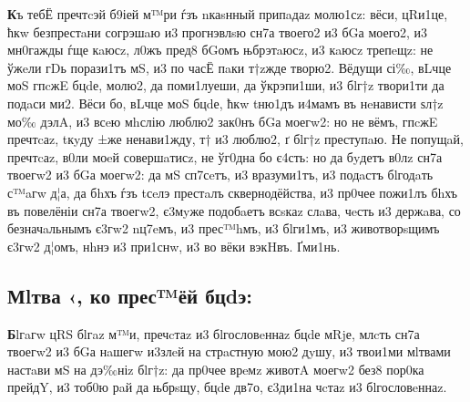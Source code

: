 \textbf{К}ъ тебЁ пречтcэй б9іей м™ри ѓзъ nкаsнный припaдаz молю1сz: вёси, цRи1це,
ћкw безпрестaни согрэшaю и3 прогнэвлsю сн7а твоего2 и3 бGа моего2, и3
мн0гажды ѓще кaюсz, л0жъ пред8 бGомъ њбрэтaюсz, и3 кaюсz трепeщz: не
ўжeли гDь порази1тъ мS, и3 по часЁ пaки т†zжде творю2. Вёдущи сі‰, вLчце
моS гпcжE бцdе, молю2, да поми1луеши, да ўкрэпи1ши, и3 бlг†z твори1ти да
подaси ми2. Вёси бо, вLчце моS бцdе, ћкw tню1дъ и4мамъ въ нeнависти ѕл†z
мо‰ дэлA, и3 всeю мhслію люблю2 зак0нъ бGа моегw2: но не вёмъ, гпcжE
пречтcаz, tкyду ±же ненави1жду, т† и3 люблю2, ґ бlг†z преступaю. Не
попущaй, пречтcаz, в0ли моeй совершaтисz, не ўг0дна бо є4сть: но да
бyдетъ в0лz сн7а твоегw2 и3 бGа моегw2: да мS сп7сeтъ, и3 вразуми1тъ, и3
подaстъ бlгодaть с™aгw д¦а, да бhхъ ѓзъ tсeлэ престaлъ сквернодёйства,
и3 пр0чее пожи1лъ бhхъ въ повелёніи сн7а твоегw2, є3мyже подобaетъ
всsкаz слaва, чeсть и3 держaва, со безначaльнымъ є3гw2 nц7eмъ, и3
прес™hмъ, и3 бlги1мъ, и3 животворsщимъ є3гw2 д¦омъ, нhнэ и3 при1снw, и3
во вёки вэкHвъ. Ґми1нь.

\subsection[Молитва 9, ко Пресвятей Богородице]
{Мlтва ‹, ко прес™ёй бцdэ:}

\textbf{Б}lгaгw цRS бlгaz м™и, пречcтаz и3 бlгословeннаz бцdе мRjе, млcть сн7а
твоегw2 и3 бGа нaшегw и3злeй на стрaстную мою2 дyшу, и3 твои1ми мlтвами
настaви мS на дэ‰ніz бlг†z: да пр0чее врeмz животA моегw2 без8 пор0ка
прейдY, и3 тоб0ю рaй да њбрsщу, бцdе дв7о, є3ди1на чcтаz и3
бlгословeннаz.


